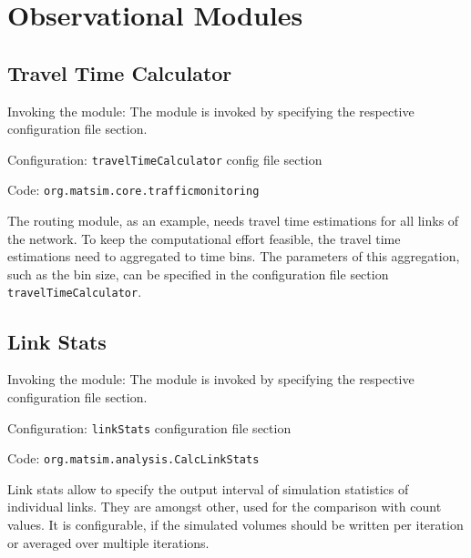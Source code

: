 \section{Observational Modules}
\label{sec:observational}

\subsection{Travel Time Calculator}
\label{sec:ttc}
\begin{compactitem}
\item Invoking the module: The module is invoked by specifying the respective configuration file section.
\item Configuration: \lstinline|travelTimeCalculator| config file section
\item Code: \lstinline|org.matsim.core.trafficmonitoring|
\end{compactitem}

The routing module, as an example, needs travel time estimations for all links of the network. To keep the computational effort feasible, the travel time estimations need to aggregated to time bins. The parameters of this aggregation, such as the bin size, can be specified in the configuration file section \lstinline|travelTimeCalculator|.

\subsection{Link Stats}
\label{sec:linkStats}
\begin{compactitem}
\item Invoking the module: The module is invoked by specifying the respective configuration file section.
\item Configuration: \lstinline|linkStats| configuration file section
\item Code: \lstinline|org.matsim.analysis.CalcLinkStats|
\end{compactitem}

Link stats allow to specify the output interval of simulation statistics of individual links. They are amongst other, used for the comparison with count values. It is configurable, if the simulated volumes should be written per iteration or averaged over multiple iterations.

